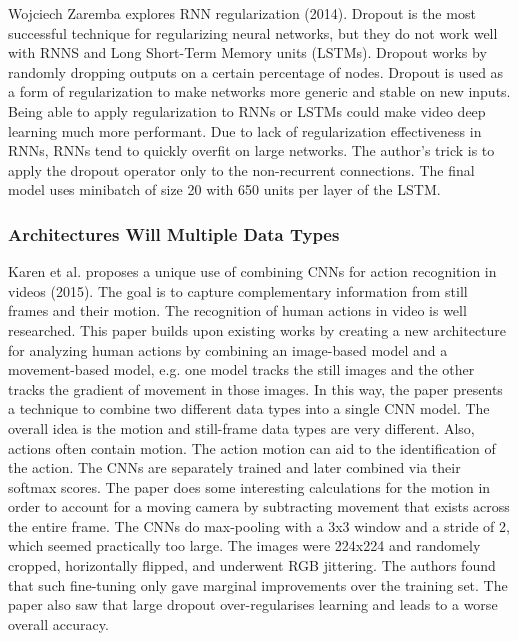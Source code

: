 Wojciech Zaremba explores RNN regularization (2014).  Dropout is the most successful technique for regularizing neural networks, but they do not work well with RNNS and Long Short-Term Memory units (LSTMs).  Dropout works by randomly dropping outputs on a certain percentage of nodes.  Dropout is used as a form of regularization to make networks more generic and stable on new inputs.  Being able to apply regularization to RNNs or LSTMs could make video deep learning much more performant.  Due to lack of regularization effectiveness in RNNs, RNNs tend to quickly overfit on large networks.  The author's trick is to apply the dropout operator only to the non-recurrent connections.  The final model uses minibatch of size 20 with 650 units per layer of the LSTM.

\subsubsection{Architectures Will Multiple Data Types}
Karen et al. proposes a unique use of combining CNNs for action recognition in videos (2015).  The goal is to capture complementary information from still frames and their motion. The recognition of human actions in video is well researched.  This paper builds upon existing works by creating a new architecture for analyzing human actions by combining an image-based model and a movement-based model, e.g. one model tracks the still images and the other tracks the gradient of movement in those images.  In this way, the paper presents a technique to combine two different data types into a single CNN model.  The overall idea is the motion and still-frame data types are very different. Also, actions often contain motion.  The action motion can aid to the identification of the action.  The CNNs are separately trained and later combined via their softmax scores.  The paper does some interesting calculations for the motion in order to account for a moving camera by subtracting movement that exists across the entire frame.  The CNNs do max-pooling with a 3x3 window and a stride of 2, which seemed practically too large.  The images were 224x224 and randomely cropped, horizontally flipped, and underwent RGB jittering.  The authors found that such fine-tuning only gave marginal improvements over the training set.  The paper also saw that large dropout over-regularises learning and leads to a worse overall accuracy.

